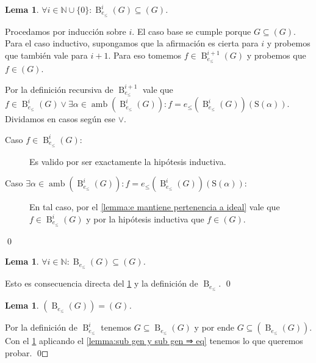 \documentclass[12pt]{report}
\theoremstyle{customstyle}
\newtheorem{lemma}[theorem]{Lema}
\renewenvironment{proof}[1][\proofname]{{\noindent \bfseries #1: }}{\qed} %
\theoremstyle{factstyle}
\DeclareMathOperator{\amb}{amb}
\renewcommand{\S}{\text{S}}
\DeclareMathOperator{\B}{B}
\begin{document}
\begin{lemma}\label{lemma:Buchberger correctitud:3}
  $∀i ∈ ℕ ∪ \{0\} : \B_{e_≤}^{i}(G) ⊆ (G)$.
\end{lemma}
\begin{proof}
  Procedamos por inducción sobre $i$. El caso base se cumple porque $G ⊆ (G)$. Para el caso inductivo, supongamos que la afirmación es cierta para $i$ y probemos que también vale para $i + 1$. Para eso tomemos $f ∈ \B_{e_≤}^{i + 1}(G)$ y probemos que $f ∈ (G)$.

  Por la definición recursiva de $\B_{e_≤}^{i + 1}$ vale que $f ∈ \B_{e_≤}^i(G) ∨ ∃α ∈ \amb(\B_{e_≤}^i(G)) : f = e_≤(\B_{e_≤}^i(G))(\S(α))$. Dividamos en casos según ese $∨$.

  \begin{description}
    \item[Caso $f ∈ \B_{e_≤}^i(G)$:] Es valido por ser exactamente la hipótesis inductiva.
    \item[Caso $∃α ∈ \amb(\B_{e_≤}^i(G)) : f = e_≤(\B_{e_≤}^i(G))(\S(α))$:] En tal caso, por el \cref{lemma:e mantiene pertenencia a ideal} vale que $f ∈ \B_{e_≤}^i(G)$ y por la hipótesis inductiva que $f ∈ (G)$.
  \end{description}

\end{proof}

\begin{lemma}\label{lemma:Buchberger correctitud:4}
  $∀i ∈ ℕ : \B_{e_≤}(G) ⊆ (G)$.
\end{lemma}
\begin{proof}
  Esto es consecuencia directa del \cref{lemma:Buchberger correctitud:3} y la definición de $\B_{e_≤}$.
\end{proof}

\begin{lemma}\label{lemma:Buchberger correctitud:5}
  $(\B_{e_≤}(G)) = (G)$.
\end{lemma}
\begin{proof}
  Por la definición de $\B_{e_≤}^i$ tenemos $G ⊆ \B_{e_≤}(G)$ y por ende $G ⊆ (\B_{e_≤}(G))$. Con el \cref{lemma:Buchberger correctitud:4} aplicando el \cref{lemma:sub gen y sub gen ⇒ eq} tenemos lo que queremos probar.
\end{proof}
\end{document}
